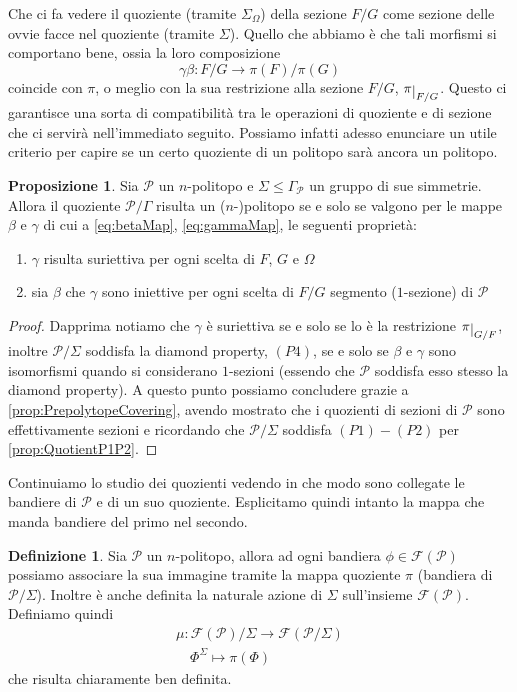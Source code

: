 \documentclass[a4paper,12pt]{report}
\newcommand{\p}{\mathcal{P}}
\theoremstyle{plain}
\theoremstyle{definition}
\newtheorem{defin}[teo]{Definizione}
\newtheorem{prop}[teo]{Proposizione}
\newcommand\flag[1]{\mathcal{F}(#1)}
\def\restrict#1{\raise-.5ex\hbox{\ensuremath|}_{#1}}
\begin{document}
Che ci fa vedere il quoziente (tramite $\Sigma_\Omega$) della sezione $F/G$ come sezione delle ovvie facce nel quoziente (tramite $\Sigma$).
Quello che abbiamo \`e che tali morfismi si comportano bene, ossia la loro composizione
\begin{equation*}
\gamma\beta:F/G\longrightarrow\pi(F)/\pi(G)
\end{equation*}
coincide con $\pi$, o meglio con la sua restrizione alla sezione $F/G$, $\pi\restrict{F/G}$. Questo ci garantisce una sorta di compatibilit\`a tra
le operazioni di quoziente e di sezione che ci servir\`a nell'immediato seguito.
Possiamo infatti adesso enunciare un utile criterio per capire se un certo quoziente di un politopo sar\`a ancora un politopo.
\begin{prop}
\label{prop:QuotientIsPolitope}
Sia $\p$ un $n$-politopo e $\Sigma\leq\Gamma_\p$ un gruppo di sue simmetrie. Allora il quoziente $\p/\Gamma$ risulta un ($n$-)politopo se e solo se
valgono per le mappe $\beta$ e $\gamma$ di cui a \ref{eq:betaMap}, \ref{eq:gammaMap}, le seguenti propriet\`a:
\begin{enumerate}
\item$\gamma$ risulta suriettiva per ogni scelta di $F$, $G$ e $\Omega$\\
\item sia $\beta$ che $\gamma$ sono iniettive per ogni scelta di $F/G$ segmento ($1$-sezione) di $\p$
\end{enumerate}
\end{prop}
\begin{proof}
Dapprima notiamo che $\gamma$ \`e suriettiva se e solo se lo \`e la restrizione $\pi\restrict{G/F}$, inoltre $\p/\Sigma$ soddisfa la diamond
 property, $(P4)$, 
se e solo se $\beta$ e $\gamma$ sono isomorfismi quando si considerano $1$-sezioni (essendo che $\p$ soddisfa esso stesso la diamond property).
A questo punto possiamo concludere grazie a \ref{prop:PrepolytopeCovering}, avendo mostrato che i quozienti di sezioni di $\p$ sono
 effettivamente
sezioni e ricordando che $\p/\Sigma$ soddisfa $(P1)-(P2)$ per \ref{prop:QuotientP1P2}.
\end{proof}
Continuiamo lo studio dei quozienti vedendo in che modo sono collegate le bandiere di $\p$ e di un suo quoziente. Esplicitamo quindi intanto la
mappa che manda bandiere del primo nel secondo.
\begin{defin}
\label{def:mu}
Sia $\p$ un $n$-politopo, allora ad ogni bandiera $\phi\in\flag{\p}$ possiamo associare la sua immagine tramite la mappa quoziente $\pi$
(bandiera di $\p/\Sigma$). Inoltre \`e anche definita la naturale azione di $\Sigma$ sull'insieme $\flag{\p}$. Definiamo quindi
\begin{gather*}
\mu:\flag{\p}/\Sigma\longrightarrow\flag{\p/\Sigma}\\
\quad\Phi^\Sigma\longmapsto\pi(\Phi)
\end{gather*}
che risulta chiaramente ben definita.
\end{defin}
\end{document}
